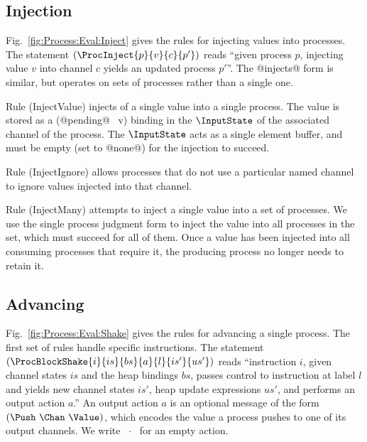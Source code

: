 \subsection{Injection}
Fig.~\ref{fig:Process:Eval:Inject} gives the rules for injecting values into processes. The statement $(\ProcInject{p}{v}{c}{p'})$ reads ``given process $p$, injecting value $v$ into channel $c$ yields an updated process $p'$''. The @injects@ form is similar, but operates on sets of processes rather than a single one.

Rule (InjectValue) injects of a single value into a single process. The value is stored as a (@pending@~ v) binding in the $\InputState$ of the associated channel of the process. The $\InputState$ acts as a single element buffer, and must be empty (set to @none@) for the injection to succeed.

Rule (InjectIgnore) allows processes that do not use a particular named channel to ignore values injected into that channel.

Rule (InjectMany) attempts to inject a single value into a set of processes. We use the single process judgment form to inject the value into all processes in the set, which must succeed for all of them. Once a value has been injected into all consuming processes that require it, the producing process no longer needs to retain it.






\subsection{Advancing}
Fig.~\ref{fig:Process:Eval:Shake} gives the rules for advancing a single process. The first set of rules handle specific instructions. The statement $(\ProcBlockShake{i}{is}{bs}{a}{l}{is'}{us'})$ reads ``instruction $i$, given channel states $is$ and the heap bindings $bs$, passes control to instruction at label $l$ and yields new channel states $is'$, heap update expressions $us'$, and performs an output action $a$.'' An output action $a$ is an optional message of the form $(\Push~\Chan~\Value)$, which encodes the value a process pushes to one of its output channels. We write ~$\cdot$~ for an empty action. 


